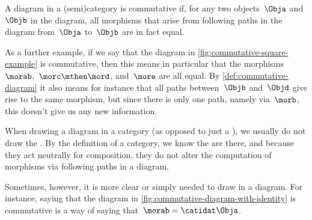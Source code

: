 \begin{marginfigure}
    \centering
    \caption{}
    \label{fig:commutative-diagram-example-prep}
\end{marginfigure}

\begin{marginfigure}
    \centering
    \caption{}
    \label{fig:commutative-diagram-example}
\end{marginfigure}

\begin{marginfigure}
    \centering
    \caption{}
    \label{fig:commutative-square-example}
\end{marginfigure}

\begin{marginfigure}
    \centering
    \caption{}
    \label{fig:commutative-diagram-with-identity}
\end{marginfigure}

\begin{definition}
    \label{def:commutative-diagram}
    A diagram in a (semi)category is commutative if, for any two objects~$\Obja$ and~$\Objb$ in the diagram, all morphisms that arise from following paths in the diagram from~$\Obja$ to~$\Objb$ are in fact equal.
\end{definition}

As a further example, if we say that the diagram in \cref{fig:commutative-square-example} is commutative, then this means in particular that the morphisms~$\morab$,~$\morc \mthen \mord$, and~$\more$ are all equal.
By \cref{def:commutative-diagram} it also means for instance that all paths between~$\Objb$ and~$\Objd$ give rise to the same morphism, but since there is only one path, namely via~$\morb$, this doesn't give us any new information.

\begin{remark}
    When drawing a diagram in a category (as opposed to just a ), we usually do not draw the .
    By the definition of a category, we know the  are there, and because they act neutrally for composition, they do not alter the computation of morphisms via following paths in a diagram.

    Sometimes, however, it is more clear or simply needed to draw  in a diagram.
    For instance, saying that the diagram in \cref{fig:commutative-diagram-with-identity} is commutative is a way of saying that~$\morab = \catidat\Obja$.
\end{remark}

